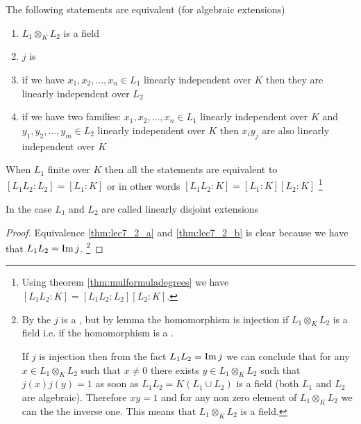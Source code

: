 \begin{theorem}
  \label{thm:lec7_2}
  The following statements are equivalent (for algebraic extensions)
  \begin{enumerate}
  \item $L_1 \otimes_K L_2$ is a field \label{thm:lec7_2_a}
  \item $j$ is  \label{thm:lec7_2_b}
  \item if we have $x_1, x_2, \dots, x_n \in L_1$ linearly independent
    over $K$ then they are linearly independent
    over $L_2$ \label{thm:lec7_2_c}
  \item if we have two families: $x_1, x_2, \dots, x_n \in L_1$ linearly independent
    over $K$ and  $y_1, y_2, \dots, y_m \in L_2$ linearly independent
    over $K$ then $x_i y_j$ are also linearly independent over $K$
    \label{thm:lec7_2_d}
  \end{enumerate}
  When $L_1$ finite over $K$ then all the statements are equivalent to
  $\left[L_1 L_2 : L_2\right] = \left[L_1 : K\right]$ or in other
  words
  $\left[L_1 L_2 : K\right] = \left[L_1 : K\right] \left[L_2 :
    K\right]$
  \footnote{
    Using theorem \ref{thm:mulformuladegrees} we have $\left[L_1 L_2 :
      K\right]  = \left[L_1 L_2 : L_2\right] \left[L_2 : K\right]$.
  }
  
  \begin{definition}
    In the case $L_1$ and $L_2$ are called linearly disjoint extensions
    \label{def:linearlydisjoint}
  \end{definition}
  \begin{proof}
    Equivalence \ref{thm:lec7_2_a} and \ref{thm:lec7_2_b} is clear
    because we have that $L_1 L_2 = \operatorname{Im} j$.
    \footnote{
      By the  $j$ is a 
      , but by lemma
       the homomorphism is
      injection if $L_1 \otimes_K L_2$ is a field i.e. if the
      homomorphism is a .

      If $j$ is injection then from the fact $L_1 L_2 = \operatorname{Im} j$ we can
      conclude that for any $x \in L_1 \otimes_K L_2$ such that $x \ne
      0$ there exists
      $y \in L_1 \otimes_K L_2$ such that $j(x) j(y) = 1$ as soon as
      $L_1 L_2 = K\left(L_1 \cup L_2\right)$ is a field
      (both $L_1$ and $L_2$ are algebraic). Therefore
      $x y = 1$ and for any non zero element of $L_1 \otimes_K L_2$ we
      can the the inverse one. This means that $L_1 \otimes_K L_2$ is
      a field.
    }


\end{proof}
\end{theorem}
